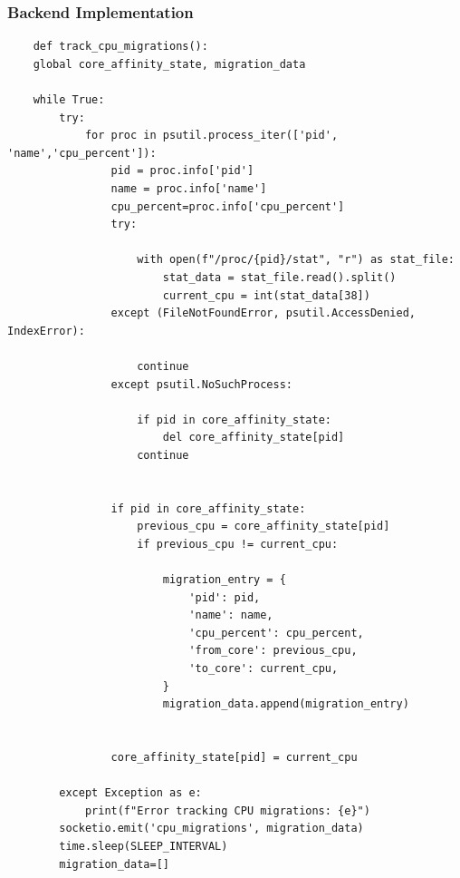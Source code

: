 \documentclass[12pt]{article}
\begin{document}
\subsubsection{Backend Implementation}
\begin{verbatim}
    def track_cpu_migrations():
    global core_affinity_state, migration_data

    while True:
        try:
            for proc in psutil.process_iter(['pid', 'name','cpu_percent']):
                pid = proc.info['pid']
                name = proc.info['name']
                cpu_percent=proc.info['cpu_percent']
                try:
                    
                    with open(f"/proc/{pid}/stat", "r") as stat_file:
                        stat_data = stat_file.read().split()
                        current_cpu = int(stat_data[38]) 
                except (FileNotFoundError, psutil.AccessDenied, IndexError):
                   
                    continue
                except psutil.NoSuchProcess:
                    
                    if pid in core_affinity_state:
                        del core_affinity_state[pid]
                    continue

                
                if pid in core_affinity_state:
                    previous_cpu = core_affinity_state[pid]
                    if previous_cpu != current_cpu:
                       
                        migration_entry = {
                            'pid': pid,
                            'name': name,
                            'cpu_percent': cpu_percent,
                            'from_core': previous_cpu,
                            'to_core': current_cpu,
                        }
                        migration_data.append(migration_entry)

                
                core_affinity_state[pid] = current_cpu

        except Exception as e:
            print(f"Error tracking CPU migrations: {e}")
        socketio.emit('cpu_migrations', migration_data) 
        time.sleep(SLEEP_INTERVAL) 
        migration_data=[]
\end{verbatim}
\end{document}
